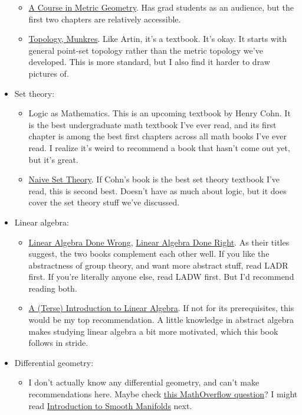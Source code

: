\documentclass[11pt,paper=letter]{scrartcl}
\begin{document}
\begin{itemize}
\begin{itemize}
  \item \href{https://citeseerx.ist.psu.edu/viewdoc/download?doi=10.1.1.368.3775&rep=rep1&type=pdf}{A Course in Metric Geometry}. Has grad students as an audience, but the first two chapters are relatively accessible.
  \item \href{http://mathcenter.spb.ru/nikaan/2019/topology/4.pdf}{Topology, Munkres}. Like Artin, it's a textbook. It's okay. It starts with general point-set topology rather than the metric topology we've developed. This is more standard, but I also find it harder to draw pictures of.
\end{itemize}
\item Set theory:
\begin{itemize}
  \item Logic as Mathematics. This is an upcoming textbook by Henry Cohn. It is the best undergraduate math textbook I've ever read, and its first chapter is among the best first chapters across all math books I've ever read. I realize it's weird to recommend a book that hasn't come out yet, but it's great.
  \item \href{https://en.wikipedia.org/wiki/Naive_Set_Theory_(book)}{Naive Set Theory}. If Cohn's book is the best set theory textbook I've read, this is second best. Doesn't have as much about logic, but it does cover the set theory stuff we've discussed.
\end{itemize}
\item Linear algebra:
\begin{itemize}
  \item \href{https://www.math.brown.edu/streil/papers/LADW/LADW.html}{Linear Algebra Done Wrong}, \href{https://linear.axler.net/}{Linear Algebra Done Right}. As their titles suggest, the two books complement each other well. If you like the abstractness of group theory, and want more abstract stuff, read LADR first. If you're literally anyone else, read LADW first. But I'd recommend reading both.
  \item \href{https://www.amazon.com/Introduction-Algebra-Student-Mathematical-Library/dp/0821844199}{A (Terse) Introduction to Linear Algebra}. If not for its prerequisites, this would be my top recommendation. A little knowledge in abstract algebra makes studying linear algebra a bit more motivated, which this book follows in stride.
\end{itemize}
\item Differential geometry:
\begin{itemize}
  \item I don't actually know any differential geometry, and can't make recommendations here. Maybe check \href{https://mathoverflow.net/questions/395/reading-list-for-basic-differential-geometry}{this MathOverflow question}? I might read \href{https://math.berkeley.edu/~jchaidez/materials/reu/lee_smooth_manifolds.pdf}{Introduction to Smooth Manifolds} next.

\end{itemize}
\end{itemize}
\end{document}

